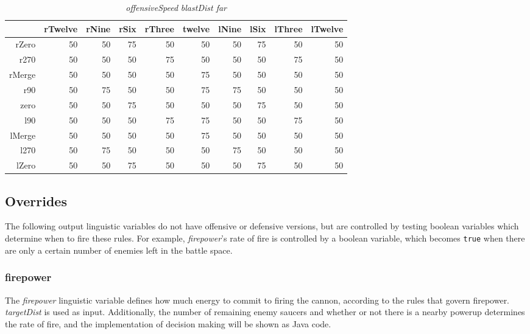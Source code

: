 \begin{table}[H]
\centering
\caption{\emph{offensiveSpeed} \emph{blastDist far}}
\begin{tabular}{r|r|r|r|r|r|r|r|r|r}
 		& rTwelve 	& rNine 	& rSix 		& rThree 		& twelve 	& lNine 	& lSix 		& lThree	& lTwelve		\\ \hline
rZero	& 50		& 50		& 75		& 50 		 	& 50		& 50		& 75 		& 50		& 50			\\
r270	& 50		& 50		& 50		& 75			& 50		& 50		& 50		& 75		& 50			\\
rMerge	& 50		& 50		& 50	 	& 50			& 75		& 50		& 50		& 50		& 50			\\
r90		& 50		& 75		& 50 		& 50			& 75		& 75		& 50		& 50		& 50			\\
zero 	& 50		& 50 		& 75 		& 50			& 50		& 50		& 75		& 50		& 50			\\
l90 	& 50		& 50 		& 50		& 75			& 75		& 50		& 50		& 75		& 50			\\
lMerge	& 50		& 50 		& 50	 	& 50			& 75		& 50		& 50		& 50		& 50			\\
l270 	& 50		& 75	 	& 50 		& 50			& 50		& 75		& 50		& 50		& 50			\\
lZero 	& 50		& 50 		& 75	 	& 50			& 50		& 50  		& 75		& 50		& 50			
\end{tabular}
\end{table}

\subsection{Overrides}

The following output linguistic variables do not have offensive or defensive versions, but are controlled by testing boolean variables which determine when to fire these rules. For example, \emph{firepower}'s rate of fire is controlled by a boolean variable, which becomes \texttt{true} when there are only a certain number of enemies left in the battle space.

\subsubsection{firepower}

The \emph{firepower} linguistic variable defines how much energy to commit to firing the cannon, according to the rules that govern firepower. \emph{targetDist} is used as input. Additionally, the number of remaining enemy saucers and whether or not there is a nearby powerup determines the rate of fire, and the implementation of decision making will be shown as Java code.

